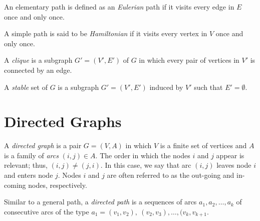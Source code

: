\documentclass[12pt]{article}
\theoremstyle{definition}
\begin{document}
An elementary path is defined as an \emph{Eulerian} path if it visits every edge in $E$ once and only once. 

A simple path is said to be \emph{Hamiltonian} if it visits every vertex in $V$ once and only once.

A \emph{clique} is a subgraph $G' = (V',E')$ of $G$ in which every pair of vertices in $V'$ is connected by an edge.

A \emph{stable} set of $G$ is a subgraph $G' = (V', E')$ induced by $V'$ such that $E' = \emptyset$. 

\section{Directed Graphs}

A \emph{directed graph} is a pair $G = (V, A)$ in which $V$ is a finite set of vertices and $A$ is a family of \emph{arcs} $(i,j) \in A$. The order in which the nodes $i$ and $j$ appear is relevant; thus, $(i,j) \ne (j,i)$. In this case, we say that arc $(i,j)$ leaves node $i$ and enters node $j$. Nodes $i$ and $j$ are often referred to as the out-going and in-coming nodes, respectively. 

Similar to a general path, a \emph{directed path} is a sequences of arcs $a_1, a_2, \dots, a_k$ of consecutive arcs of the type $a_1 = (v_1, v_2), \ (v_2,v_3), \dots, (v_k, v_{k+1}$. 
\end{document}
